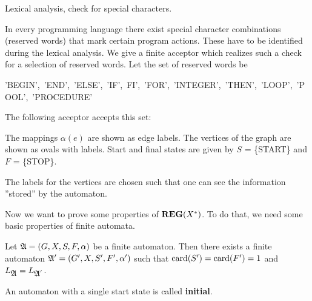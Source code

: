 \bigskip
\begin{example}
Lexical analysis, check for special characters.

In every programming language there exist special character combinations
(reserved words) that mark certain program actions. These have to be identified
during the lexical analysis. We give a finite acceptor which realizes such a 
check for a selection of reserved words. Let the set of reserved words be

\begin{rm}
'BEGIN',\ 'END',\ 'ELSE',\ 'IF',\ FI',\ 'FOR',\ 'INTEGER',\ 'THEN',\
'LOOP',\ 'POOL',\ 'PROCEDURE'
\end{rm}

The following acceptor accepts this set:

\begin{minipage}{\textwidth}
\begin{sideways}
\begin{rm}
\begin{tiny}

\end{tiny}
\end{rm}
\end{sideways}
\end{minipage}
\end{example}

The mappings $\alpha(e)$ are shown as edge labels. The vertices of the
graph are shown as ovals with labels. Start and final states are
given by $S$ = \{START\} and $F$ = \{STOP\}.

The labels for the vertices are chosen such that one can see the information
''stored'' by the automaton.

\bigskip
Now we want to prove some properties of $\mbox{{\bf REG}}(X^*)$. To do that, we need
some basic properties of finite automata.

\begin{lemma}
Let $\mbox{$\mathfrak{A}$} = (G, X, S, F, \alpha)$ be a finite automaton. Then there
exists a finite automaton $\mbox{$\mathfrak{A'}$} = (G', X, S', F', \alpha')$ such that
$\mathrm{card}({S'}) = \mathrm{card}({F'}) = 1$ and $L_{\mbox{$\mathfrak{A}$}} = L_{\mbox{$\mathfrak{A}$}'}$.
\end{lemma}

An automaton with a single start state is called {\bf initial}.

